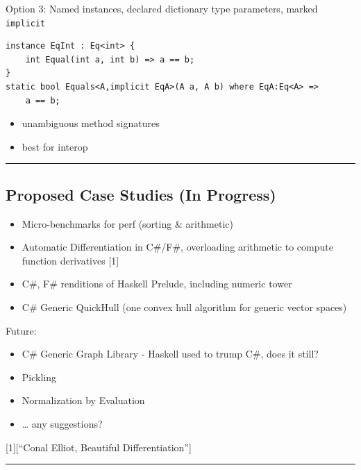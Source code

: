 Option 3: Named instances, declared dictionary type parameters, marked
\lstinline!implicit!

\begin{lstlisting}
instance EqInt : Eq<int> {
    int Equal(int a, int b) => a == b;
}
static bool Equals<A,implicit EqA>(A a, A b) where EqA:Eq<A> =>
    a == b;
\end{lstlisting}

\begin{itemize}
\tightlist
\item
  unambiguous method signatures
\item
  best for interop
\end{itemize}

\begin{center}\rule{0.5\linewidth}{\linethickness}\end{center}

\subsection{Proposed Case Studies (In
Progress)}\label{proposed-case-studies-in-progress}

\begin{itemize}
\tightlist
\item
  Micro-benchmarks for perf (sorting \& arithmetic)
\item
  Automatic Differentiation in C\#/F\#, overloading arithmetic to
  compute function derivatives {[}1{]}
\item
  C\#, F\# renditions of Haskell Prelude, including numeric tower
\item
  C\# Generic QuickHull (one convex hull algorithm for generic vector
  spaces)
\end{itemize}

Future:

\begin{itemize}
\tightlist
\item
  C\# Generic Graph Library - Haskell used to trump C\#, does it still?
\item
  Pickling
\item
  Normalization by Evaluation
\item
  \ldots{} any suggestions?
\end{itemize}

{[}1{]}{[}``Conal Elliot, Beautiful Differentiation''{]}

\begin{center}\rule{0.5\linewidth}{\linethickness}\end{center}

